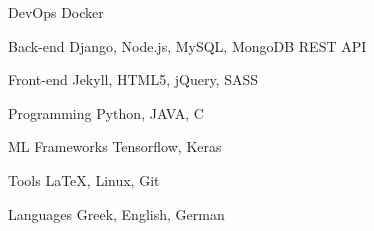

\begin{cvskills}

  \cvskill
    {DevOps} %
    {Docker} %

  \cvskill
    {Back-end} %
    {Django, Node.js, MySQL, MongoDB REST API} %

  \cvskill
    {Front-end} %
    {Jekyll, HTML5, jQuery, SASS} %

  \cvskill
    {Programming} %
    {Python, JAVA, C} %


  \cvskill
    {ML Frameworks} %
    {Tensorflow, Keras} %

  \cvskill
    {Tools} %
    {LaTeX, Linux, Git} %

  \cvskill
    {Languages} %
    {Greek, English, German} %

\end{cvskills}
